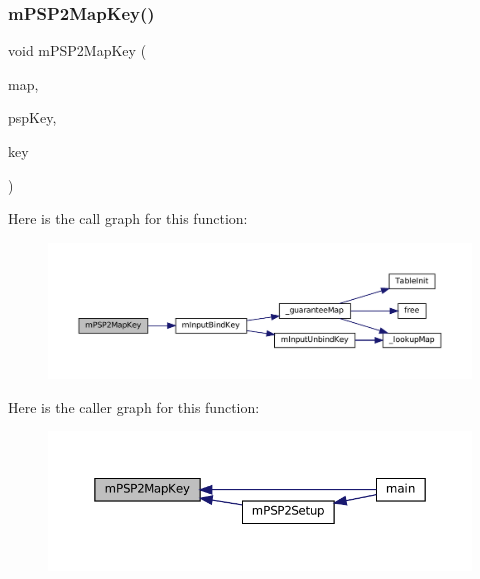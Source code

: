 \subsubsection{\texorpdfstring{m\+P\+S\+P2\+Map\+Key()}{mPSP2MapKey()}}
{\footnotesize\ttfamily void m\+P\+S\+P2\+Map\+Key (\begin{DoxyParamCaption}\item[{struct m\+Input\+Map $\ast$}]{map,  }\item[{\mbox{\hyperlink{ioapi_8h_a787fa3cf048117ba7123753c1e74fcd6}{int}}}]{psp\+Key,  }\item[{\mbox{\hyperlink{ioapi_8h_a787fa3cf048117ba7123753c1e74fcd6}{int}}}]{key }\end{DoxyParamCaption})}

Here is the call graph for this function\+:
\nopagebreak
\begin{figure}[H]
\begin{center}
\leavevmode
\includegraphics[width=350pt]{psp2-context_8h_a0ff9569feeb9a2f318792b681331c9ab_cgraph}
\end{center}
\end{figure}
Here is the caller graph for this function\+:
\nopagebreak
\begin{figure}[H]
\begin{center}
\leavevmode
\includegraphics[width=350pt]{psp2-context_8h_a0ff9569feeb9a2f318792b681331c9ab_icgraph}
\end{center}
\end{figure}
\mbox{\label{psp2-context_8h_a7f9c754e1ebf551ba6e39e76d7135f91}} 
